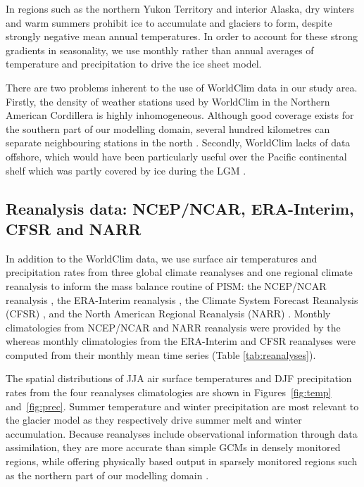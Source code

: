 In regions such as the northern Yukon Territory and interior Alaska, dry winters and warm summers prohibit ice to accumulate and glaciers to form, despite strongly negative mean annual temperatures. In order to account for these strong gradients in seasonality, we use monthly rather than annual averages of temperature and precipitation to drive the ice sheet model.

There are two problems inherent to the use of WorldClim data in our study area. Firstly, the density of weather stations used by WorldClim in the Northern American Cordillera is highly inhomogeneous. Although good coverage exists for the southern part of our modelling domain, several hundred kilometres can separate neighbouring stations in the north \citep{data:worldclim}. Secondly, WorldClim lacks of data offshore, which would have been particularly useful over the Pacific continental shelf which was partly covered by ice during the LGM \citep{jackson-clague-1991}.


\subsection{Reanalysis data: NCEP/NCAR, ERA-Interim, CFSR and NARR}

In addition to the WorldClim data, we use surface air temperatures and precipitation rates from three global climate reanalyses and one regional climate reanalysis to inform the mass balance routine of PISM: the NCEP/NCAR reanalysis \citep{data:ncar}, the ERA-Interim reanalysis \citep{data:erai}, the Climate System Forecast Reanalysis (CFSR) \citep{data:cfsr}, and the North American Regional Reanalysis (NARR) \citep{data:narr}. Monthly climatologies from NCEP/NCAR and NARR reanalysis were provided by the \citet{web:psd} whereas monthly climatologies from the ERA-Interim and CFSR reanalyses were computed from their monthly mean time series (Table \ref{tab:reanalyses}).

The spatial distributions of JJA air surface temperatures and DJF precipitation rates from the four reanalyses climatologies are shown in Figures~\ref{fig:temp} and~\ref{fig:prec}. Summer temperature and winter precipitation are most relevant to the glacier model as they respectively drive summer melt and winter accumulation. Because reanalyses include observational information through data assimilation, they are more accurate than simple GCMs in densely monitored regions, while offering physically based output in sparsely monitored regions such as the northern part of our modelling domain \citep{bengtsson-etal-2007}.

